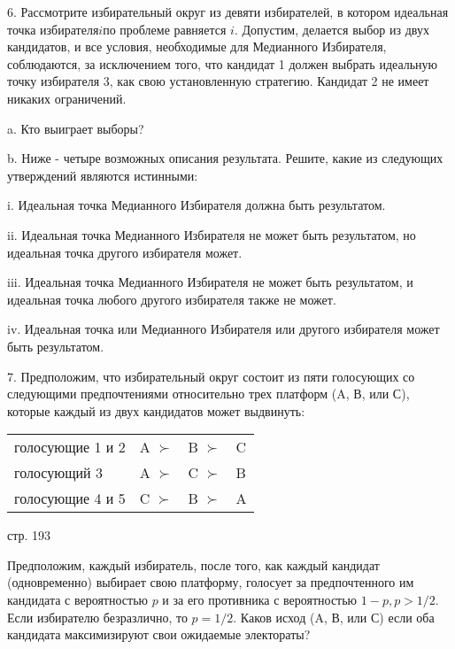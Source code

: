 \documentclass[a4paper,12pt]{article}
\begin{document}
6. Рассмотрите избирательный округ из девяти
избирателей, в котором идеальная точка
избирателя$i$по проблеме равняется $i$. Допустим,
делается выбор из двух кандидатов, и все условия,
необходимые для Медианного Избирателя, соблюдаются,
за исключением того, что кандидат 1 должен выбрать
идеальную точку избирателя 3, как свою
установленную стратегию. Кандидат 2 не имеет
никаких ограничений.

a. Кто выиграет выборы?

b. Ниже - четыре возможных описания результата.
Решите, какие из следующих утверждений являются
истинными:

i. Идеальная точка Медианного Избирателя должна
быть результатом.

ii. Идеальная точка Медианного Избирателя не может
быть результатом, но идеальная точка другого
избирателя может.

iii. Идеальная точка Медианного Избирателя не может
быть результатом, и идеальная точка любого другого
избирателя также не может.

iv. Идеальная точка или Медианного Избирателя или
другого избирателя может быть результатом.

7. Предположим, что избирательный округ состоит из
пяти голосующих со следующими предпочтениями
относительно трех платформ (A, В, или С), которые
каждый из двух кандидатов может выдвинуть:

\begin{tabular}{llll}
голосующие 1 и 2 & A $\succ $ & B $\succ $ & C \\
голосующий 3 & A $\succ $ & C $\succ $ & B \\
голосующие 4 и 5 & C $\succ $ & B $\succ $ &
A\end{tabular}

стр. 193

Предположим, каждый избиратель, после того, как
каждый кандидат (одновременно) выбирает свою
платформу, голосует за предпочтенного им кандидата
с вероятностью $p$ и за его противника с
вероятностью $1-p,p>1/2$. Если избирателю
безразлично, то $p=1/2$. Каков исход (A, В, или С)
если оба кандидата максимизируют свои ожидаемые
электораты?

\bigskip \bigskip
\end{document}
